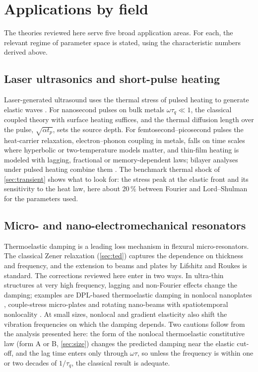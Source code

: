 \section{Applications by field}\label{sec:applications}
The theories reviewed here serve five broad application areas. For each, the relevant regime of parameter space is stated, using the characteristic numbers derived above.

\subsection{Laser ultrasonics and short-pulse heating}
Laser-generated ultrasound uses the thermal stress of pulsed heating to generate elastic waves \citep{Scruby1990}. For nanosecond pulses on bulk metals $\omega\tau_q\ll1$, the classical coupled theory with surface heating suffices, and the thermal diffusion length over the pulse, $\sqrt{\alpha t_p}$, sets the source depth. For femtosecond--picosecond pulses the heat-carrier relaxation, electron--phonon coupling in metals, falls on time scales where hyperbolic or two-temperature models matter, and thin-film heating is modeled with lagging, fractional or memory-dependent laws; bilayer analyses under pulsed heating combine them \citep{Li2019}. The benchmark thermal shock of \cref{sec:transient} shows what to look for: the stress peak at the elastic front and its sensitivity to the heat law, here about 20\,\% between Fourier and Lord--Shulman for the parameters used.

\subsection{Micro- and nano-electromechanical resonators}
Thermoelastic damping is a leading loss mechanism in flexural micro-resonators. The classical Zener relaxation (\cref{sec:ted}) captures the dependence on thickness and frequency, and the extension to beams and plates by Lifshitz and Roukes \citep{Lifshitz2000} is standard. The corrections reviewed here enter in two ways. In ultra-thin structures at very high frequency, lagging and non-Fourier effects change the damping; examples are DPL-based thermoelastic damping in nonlocal nanoplates \citep{Yang2021}, couple-stress micro-plates \citep{Kumar2017} and rotating nano-beams with spatiotemporal nonlocality \citep{Sur2025}. At small sizes, nonlocal and gradient elasticity also shift the vibration frequencies on which the damping depends. Two cautions follow from the analysis presented here: the form of the nonlocal thermoelastic constitutive law (form A or B, \cref{sec:size}) changes the predicted damping near the elastic cut-off, and the lag time enters only through $\omega\tau$, so unless the frequency is within one or two decades of $1/\tau_q$, the classical result is adequate.

